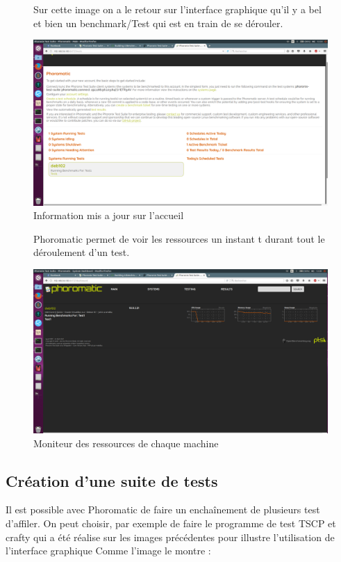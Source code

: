 \documentclass[french]{article}
\begin{document}
\begin{figure}[!h]
Sur cette image on a le retour sur l'interface graphique qu'il y a bel et bien un benchmark/Test qui est en train de se dérouler.
\caption{\label{Information mis a jour sur l'accueil} Information mis a jour sur l'accueil}
\includegraphics[scale=0.35]{images/debrunningTest.png}
\end{figure}
\newpage
\begin{figure}[!h]
Phoromatic permet de voir les ressources un instant t durant tout le déroulement d'un test.
\caption{\label{Moniteur des ressource de chaque machine} Moniteur des ressources de chaque machine }
\includegraphics[scale=0.35]{images/monitoring.png}
\end{figure}

\newpage
\subsection{Création d'une suite de tests}
Il est possible avec Phoromatic de faire un enchaînement de plusieurs test d'affiler. On peut choisir, par exemple de faire le programme de test TSCP et crafty qui a été réalise sur les images précédentes pour illustre l'utilisation de l'interface graphique 
Comme l'image le montre :  
\end{document}
